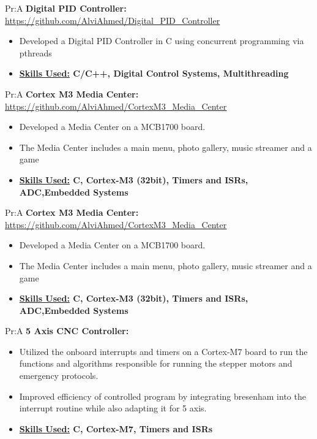 \documentclass[11pt]{article}
\newcommand{\spaces}{1em}
\begin{document}
 
Pr:A
\vspace{\spaces}
\textbf{Digital PID Controller: }
\underline{\url{https://github.com/AlviAhmed/Digital_PID_Controller}}
\begin{itemize}[noitemsep,nolistsep]
\item Developed a Digital PID Controller in C using concurrent programming via pthreads
\item \textbf{ \underline{Skills Used:} C/C++, Digital Control Systems, Multithreading}
\end{itemize} 

 
Pr:A
\vspace{\spaces}
\textbf{Cortex M3 Media Center: } 
\underline{\url{https://github.com/AlviAhmed/CortexM3_Media_Center}}
\begin{itemize}[noitemsep,nolistsep]
\item Developed a Media Center on a MCB1700 board.
\item The Media Center includes a main menu, photo gallery, music streamer and a game 
\item \textbf{ \underline{Skills Used:} C, Cortex-M3 (32bit), Timers and ISRs, ADC,Embedded Systems}
\end{itemize} 


 
Pr:A
\vspace{\spaces}
\textbf{Cortex M3 Media Center: } 
\underline{\url{https://github.com/AlviAhmed/CortexM3_Media_Center}}
\begin{itemize}[noitemsep,nolistsep]
\item Developed a Media Center on a MCB1700 board.
\item The Media Center includes a main menu, photo gallery, music streamer and a game 
\item \textbf{ \underline{Skills Used:} C, Cortex-M3 (32bit), Timers and ISRs, ADC,Embedded Systems}
\end{itemize} 

   
Pr:A
\vspace{\spaces}
\textbf{5 Axis CNC Controller: } 
\begin{itemize}[noitemsep,nolistsep]
\item Utilized the onboard interrupts and timers on a Cortex-M7 board to run the functions and algorithms responsible for running the stepper motors and emergency protocols.
\item Improved efficiency of controlled program by integrating bresenham into the interrupt routine while also adapting it for 5 axis.
\item \textbf{ \underline{Skills Used:} C, Cortex-M7, Timers and ISRs}
\end{itemize} 
\end{document}
